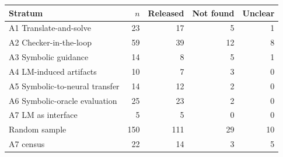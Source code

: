 \begin{tabular}{@{}lrrrr@{}}
\toprule
Stratum & $n$ & Released & Not found & Unclear \\
\midrule
\quad A1 Translate-and-solve & 23 & 17 & 5 & 1 \\
\quad A2 Checker-in-the-loop & 59 & 39 & 12 & 8 \\
\quad A3 Symbolic guidance & 14 & 8 & 5 & 1 \\
\quad A4 LM-induced artifacts & 10 & 7 & 3 & 0 \\
\quad A5 Symbolic-to-neural transfer & 14 & 12 & 2 & 0 \\
\quad A6 Symbolic-oracle evaluation & 25 & 23 & 2 & 0 \\
\quad A7 LM as interface & 5 & 5 & 0 & 0 \\
\midrule
Random sample & 150 & 111 & 29 & 10 \\
A7 census & 22 & 14 & 3 & 5 \\
\bottomrule
\end{tabular}
